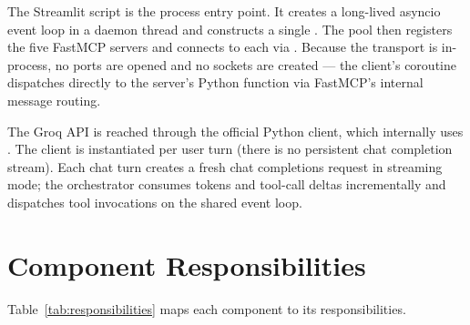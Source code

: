 The Streamlit script is the process entry point. It creates a
long-lived asyncio event loop in a daemon thread and constructs a
single . The pool then registers the five
FastMCP servers and connects to each via .
Because the transport is in-process, no ports are opened and no
sockets are created --- the client's  coroutine
dispatches directly to the server's Python function via FastMCP's
internal message routing.

The Groq API is reached through the official  Python
client, which internally uses . The client is
instantiated per user turn (there is no persistent chat completion
stream). Each chat turn creates a fresh chat completions request in
streaming mode; the orchestrator consumes tokens and tool-call
deltas incrementally and dispatches tool invocations on the shared
event loop.

\section{Component Responsibilities}
\label{sec:responsibilities}

Table~\ref{tab:responsibilities} maps each component to its
responsibilities.


